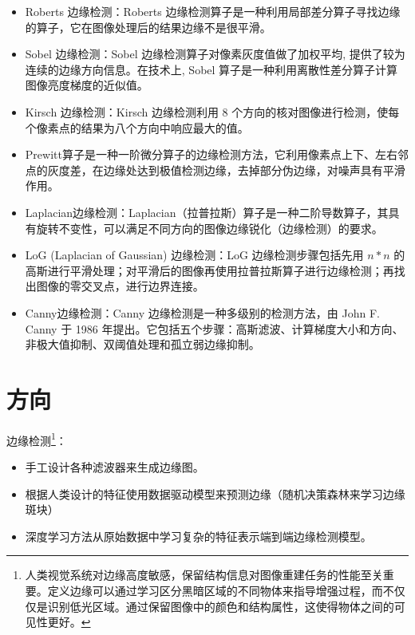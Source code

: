 \documentclass[letterpaper,10pt]{article}
\begin{document}
						
			\begin{itemize}
				\item[1)] 
				Roberts 边缘检测：Roberts 边缘检测算子是一种利用局部差分算子寻找边缘的算子，它在图像处理后的结果边缘不是很平滑。
				
				\item[2)]
				Sobel 边缘检测：Sobel 边缘检测算子对像素灰度值做了加权平均, 提供了较为连续的边缘方向信息。在技术上, Sobel 算子是一种利用离散性差分算子计算图像亮度梯度的近似值。
				
				\item[3)]
				Kirsch 边缘检测：Kirsch 边缘检测利用 8 个方向的核对图像进行检测，使每个像素点的结果为八个方向中响应最大的值。
				
				\item[4)]
				Prewitt算子是一种一阶微分算子的边缘检测方法，它利用像素点上下、左右邻点的灰度差，在边缘处达到极值检测边缘，去掉部分伪边缘，对噪声具有平滑作用。
				
				\item[5)]
				Laplacian边缘检测：Laplacian（拉普拉斯）算子是一种二阶导数算子，其具有旋转不变性，可以满足不同方向的图像边缘锐化（边缘检测）的要求。
				
				\item[6)]
				LoG (Laplacian of Gaussian) 边缘检测：LoG 边缘检测步骤包括先用 $n*n$ 的高斯进行平滑处理；对平滑后的图像再使用拉普拉斯算子进行边缘检测；再找出图像的零交叉点，进行边界连接。
				
				\item[7)]
				Canny边缘检测：Canny 边缘检测是一种多级别的检测方法，由 John F. Canny 于 1986 年提出。它包括五个步骤：高斯滤波、计算梯度大小和方向、非极大值抑制、双阈值处理和孤立弱边缘抑制。
				
			\end{itemize}	

	\section{方向}
	
		边缘检测\footnote{人类视觉系统对边缘高度敏感，保留结构信息对图像重建任务的性能至关重要。定义边缘可以通过学习区分黑暗区域的不同物体来指导增强过程，而不仅仅是识别低光区域。通过保留图像中的颜色和结构属性，这使得物体之间的可见性更好。}：
		
		\begin{itemize}
			\item[(1)] 
			手工设计各种滤波器来生成边缘图。
			
			\item[(2)]
			根据人类设计的特征使用数据驱动模型来预测边缘（随机决策森林来学习边缘斑块）
			
			\item[(3)]
			深度学习方法从原始数据中学习复杂的特征表示端到端边缘检测模型。
		\end{itemize}	
	
\end{document}
